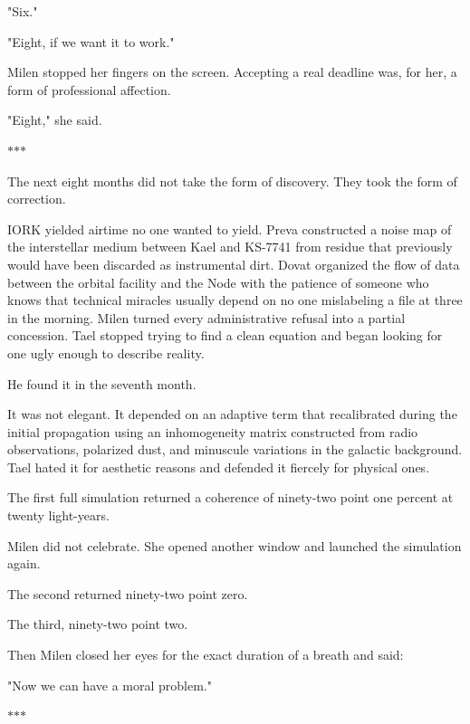 \documentclass[11pt,a5paper,twoside]{book}
\begin{document}
"Six."

"Eight, if we want it to work."

Milen stopped her fingers on the screen. Accepting a real deadline was, for her, a form of professional affection.

"Eight," she said.

\vspace{1.5em}
\begin{center}$\ast$\quad$\ast$\quad$\ast$\end{center}
\vspace{1.5em}

The next eight months did not take the form of discovery. They took the form of correction.

IORK yielded airtime no one wanted to yield. Preva constructed a noise map of the interstellar medium between Kael and KS-7741 from residue that previously would have been discarded as instrumental dirt. Dovat organized the flow of data between the orbital facility and the Node with the patience of someone who knows that technical miracles usually depend on no one mislabeling a file at three in the morning. Milen turned every administrative refusal into a partial concession. Tael stopped trying to find a clean equation and began looking for one ugly enough to describe reality.

He found it in the seventh month.

It was not elegant. It depended on an adaptive term that recalibrated during the initial propagation using an inhomogeneity matrix constructed from radio observations, polarized dust, and minuscule variations in the galactic background. Tael hated it for aesthetic reasons and defended it fiercely for physical ones.

The first full simulation returned a coherence of ninety-two point one percent at twenty light-years.

Milen did not celebrate. She opened another window and launched the simulation again.

The second returned ninety-two point zero.

The third, ninety-two point two.

Then Milen closed her eyes for the exact duration of a breath and said:

"Now we can have a moral problem."

\vspace{1.5em}
\begin{center}$\ast$\quad$\ast$\quad$\ast$\end{center}
\vspace{1.5em}
\end{document}
